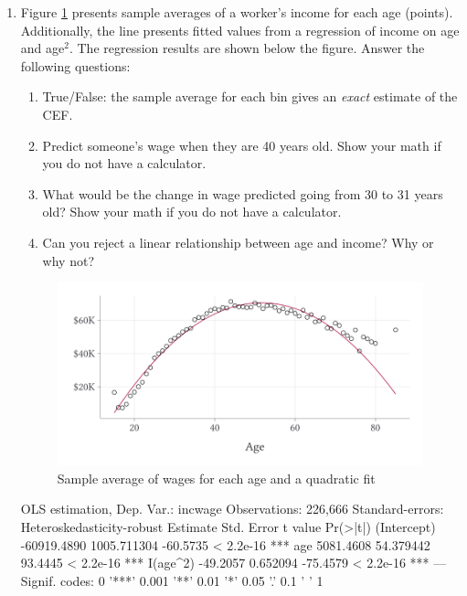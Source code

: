 \documentclass[12pt]{article}
\begin{document}
\begin{enumerate}
  \bigskip
  \item Figure \ref{fig:wage_vs_age} presents sample averages of a worker's income for each age (points).
  Additionally, the line presents fitted values from a regression of income on age and age$^2$.
  The regression results are shown below the figure. Answer the following questions:

  \begin{enumerate}
    \item True/False: the sample average for each bin gives an \emph{exact} estimate of the CEF.

    \item Predict someone's wage when they are 40 years old. Show your math if you do not have a calculator.

    \item What would be the change in wage predicted going from 30 to 31 years old? Show your math if you do not have a calculator.

    \item Can you reject a linear relationship between age and income? Why or why not?
  \end{enumerate}

  \begin{figure}
    \caption{Sample average of wages for each age and a quadratic fit}
    \label{fig:wage_vs_age}
    \includegraphics[width = \linewidth]{figures/plot_wage_age.pdf}
  \end{figure}

  \vspace*{-2\bigskipamount}
  \begin{codeblock}[{}]
OLS estimation, Dep. Var.: incwage
Observations: 226,666
Standard-errors: Heteroskedasticity-robust
                Estimate  Std. Error  t value  Pr(>|t|)
(Intercept) -60919.4890 1005.711304 -60.5735 < 2.2e-16 ***
age           5081.4608   54.379442  93.4445 < 2.2e-16 ***
I(age^2)       -49.2057    0.652094 -75.4579 < 2.2e-16 ***
---
Signif. codes:  0 '***' 0.001 '**' 0.01 '*' 0.05 '.' 0.1 ' ' 1
  \end{codeblock}


\end{enumerate}
\end{document}
